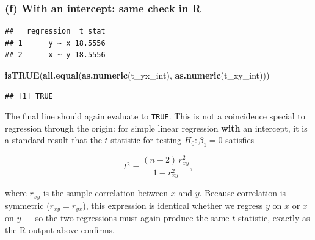 \documentclass[
  11pt,
]{article}
\newenvironment{Shaded}{\begin{snugshade}}{\end{snugshade}}
\newcommand{\AttributeTok}[1]{\textcolor[rgb]{0.13,0.29,0.53}{#1}}
\newcommand{\FunctionTok}[1]{\textcolor[rgb]{0.13,0.29,0.53}{\textbf{#1}}}
\newcommand{\NormalTok}[1]{#1}
\newcommand{\OtherTok}[1]{\textcolor[rgb]{0.56,0.35,0.01}{#1}}
\newcommand{\SpecialCharTok}[1]{\textcolor[rgb]{0.81,0.36,0.00}{\textbf{#1}}}
\newcommand{\StringTok}[1]{\textcolor[rgb]{0.31,0.60,0.02}{#1}}
\begin{document}
\subsubsection{(f) With an intercept: same check in
R}\label{f-with-an-intercept-same-check-in-r}

\begin{Shaded}
\end{Shaded}

\begin{verbatim}
##   regression  t_stat
## 1      y ~ x 18.5556
## 2      x ~ y 18.5556
\end{verbatim}

\begin{Shaded}
\begin{Highlighting}[]
\FunctionTok{isTRUE}\NormalTok{(}\FunctionTok{all.equal}\NormalTok{(}\FunctionTok{as.numeric}\NormalTok{(t\_yx\_int), }\FunctionTok{as.numeric}\NormalTok{(t\_xy\_int)))}
\end{Highlighting}
\end{Shaded}

\begin{verbatim}
## [1] TRUE
\end{verbatim}

The final line should again evaluate to \texttt{TRUE}. This is not a
coincidence special to regression through the origin: for simple linear
regression \textbf{with} an intercept, it is a standard result that the
\(t\)-statistic for testing \(H_0 : \beta_1 = 0\) satisfies

\[
t^2 = \frac{(n-2)\, r_{xy}^2}{1 - r_{xy}^2},
\]

where \(r_{xy}\) is the sample correlation between \(x\) and \(y\).
Because correlation is symmetric (\(r_{xy} = r_{yx}\)), this expression
is identical whether we regress \(y\) on \(x\) or \(x\) on \(y\) --- so
the two regressions must again produce the same \(t\)-statistic, exactly
as the R output above confirms.

\newpage
\end{document}

